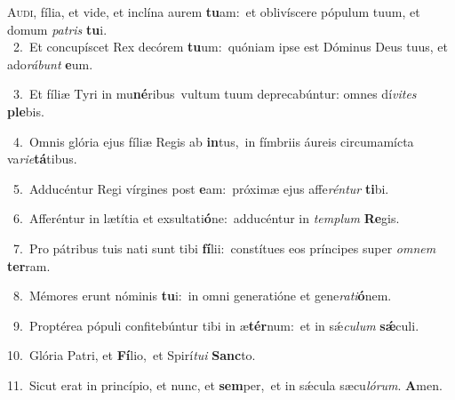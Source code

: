 \lettrine{\initial\textcolor{\initialcolor}{A}}{udi,} fília, et vide, et inclína aurem \textbf{tu}\-am:~\star et oblivíscere pópulum tuum, et domum \textit{pa}\-\textit{tris} \textbf{tu}\-i.\\
{\numbfont\textcolor{\numbcolor}{~2.}}~Et concupíscet Rex decórem \textbf{tu}\-um:~\star quóniam ipse est Dóminus Deus tuus, et ado\-\textit{rá}\-\textit{bunt} \textbf{e}\-um.\par
{\numbfont\textcolor{\numbcolor}{~3.}}~Et fíliæ Tyri in mu\-\textbf{né}\-ribus~\star vultum tuum deprecabúntur: omnes dí\-\textit{vi}\-\textit{tes} \textbf{ple}\-bis.\par
{\numbfont\textcolor{\numbcolor}{~4.}}~Omnis glória ejus fíliæ Regis ab \textbf{in}\-tus,~\star in fímbriis áureis circumamícta va\-\textit{ri}\-\textit{e}\textbf{tá}tibus.\par
{\numbfont\textcolor{\numbcolor}{~5.}}~Adducéntur Regi vírgines post \textbf{e}\-am:~\star próximæ ejus affe\-\textit{rén}\-\textit{tur} \textbf{ti}\-bi.\par
{\numbfont\textcolor{\numbcolor}{~6.}}~Afferéntur in lætítia et exsultati\-\textbf{ó}\-ne:~\star adducéntur in \textit{tem}\-\textit{plum} \textbf{Re}\-gis.\par
{\numbfont\textcolor{\numbcolor}{~7.}}~Pro pátribus tuis nati sunt tibi \textbf{fí}\-lii:~\star constítues eos príncipes super \textit{om}\-\textit{nem} \textbf{ter}\-ram.\par
{\numbfont\textcolor{\numbcolor}{~8.}}~Mémores erunt nóminis \textbf{tu}\-i:~\star in omni generatióne et gene\-\textit{ra}\-\textit{ti}\textbf{ó}nem.\par
{\numbfont\textcolor{\numbcolor}{~9.}}~Proptérea pópuli confitebúntur tibi in æ\-\textbf{tér}\-num:~\star et in sǽ\-\textit{cu}\-\textit{lum} \textbf{sǽ}\-culi.\par
{\numbfont\textcolor{\numbcolor}{10.}}~Glória Patri, et \textbf{Fí}\-lio,~\star et Spirí\-\textit{tu}\-\textit{i} \textbf{Sanc}\-to.\par
{\numbfont\textcolor{\numbcolor}{11.}}~Sicut erat in princípio, et nunc, et \textbf{sem}\-per,~\star et in sǽcula sæcu\-\textit{ló}\-\textit{rum}. \textbf{A}\-men.\par

